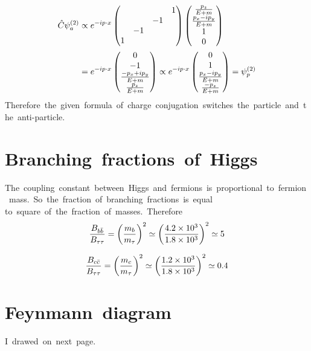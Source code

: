 \begin{align}
    \Hat{C}\psi^{(2)}_a&\propto e^{-ip\cdot x}\begin{pmatrix}
        &&&1\\
        &&-1&\\
        &-1&&\\
        1&&&
    \end{pmatrix}\begin{pmatrix}
        \frac{p_z}{E+m}\\
        \frac{p_x-ip_y}{E+m}\\
        1\\
        0
    \end{pmatrix}\nonumber\\
    &=e^{-ip\cdot x}\begin{pmatrix}
        0\\
        -1\\
        \frac{-p_x+ip_y}{E+m}\\
        \frac{p_z}{E+m}
    \end{pmatrix}\propto e^{-ip\cdot x}\begin{pmatrix}
        0\\
        1\\
        \frac{p_x-ip_y}{E+m}\\
        \frac{-p_z}{E+m}
    \end{pmatrix}=\psi^{(2)}_p
\end{align}
Therefore\ the\ given\ formula\ of\ charge\ conjugation\ switches\ the\ particle\ and\ the\ anti-particle.
\clearpage
\section{Branching\ fractions\ of\ Higgs}
The\ coupling\ constant\ between\ Higgs\ and\ fermions\ is\ proportional\ to\ fermion\ mass.\ So\ the\ fraction\ of\ branching\ fractions\ is\ equal to\ square\ of\ the\ fraction\ of\ masses.\ Therefore
\begin{align}
    \frac{B_{b\Bar{b}}}{B_{\tau\tau}}=\left(\frac{m_b}{m_{\tau}}\right)^2\simeq\left(\frac{4.2\times10^3}{1.8\times10^3}\right)^2\simeq5
\end{align}

\begin{align}
    \frac{B_{c\Bar{c}}}{B_{\tau\tau}}=\left(\frac{m_c}{m_{\tau}}\right)^2\simeq\left(\frac{1.2\times10^3}{1.8\times10^3}\right)^2\simeq0.4
\end{align}

\section{Feynmann\ diagram}
I\ drawed\ on\ next\ page.